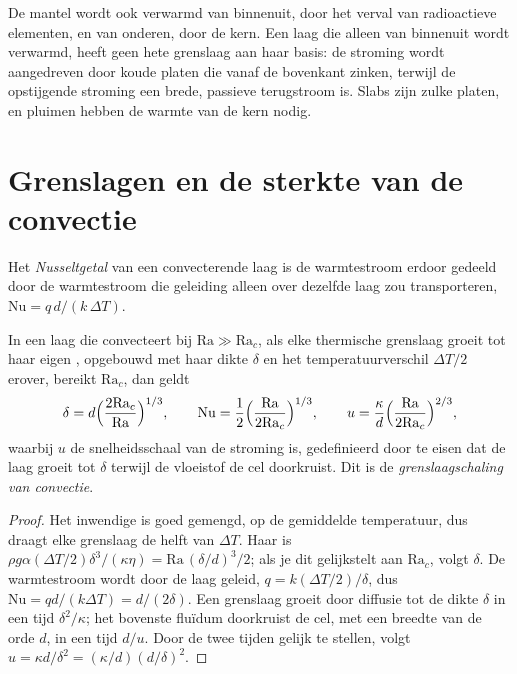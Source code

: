 De mantel wordt ook verwarmd van binnenuit, door het verval van radioactieve elementen,
en van onderen, door de kern. Een laag die alleen van binnenuit wordt verwarmd, heeft geen hete
grenslaag aan haar basis: de stroming wordt aangedreven door koude platen die vanaf de
bovenkant zinken, terwijl de opstijgende stroming een brede, passieve terugstroom is. Slabs zijn zulke platen, en
pluimen hebben de warmte van de kern nodig.

\section{Grenslagen en de sterkte van de convectie}

\begin{definition}[Nusseltgetal]\label{def:b3:mantle-convection:nusselt}
Het \emph{Nusseltgetal} van een convecterende laag is de
warmtestroom erdoor gedeeld door de warmtestroom die geleiding alleen over
dezelfde laag zou transporteren, $\mathrm{Nu} = q\,d/(k\,\Delta T)$.
\end{definition}

\begin{theorem}\label{thm:b3:mantle-convection:scaling}
In een laag die convecteert bij $\mathrm{Ra} \gg \mathrm{Ra}_c$, als elke thermische
grenslaag groeit tot haar eigen , opgebouwd met haar dikte
$\delta$ en het temperatuurverschil $\Delta T/2$ erover, bereikt
$\mathrm{Ra}_c$, dan geldt
\[
  \delta = d\Bigl(\frac{2\mathrm{Ra}_c}{\mathrm{Ra}}\Bigr)^{1/3},\qquad
  \mathrm{Nu} = \frac12\Bigl(\frac{\mathrm{Ra}}{2\mathrm{Ra}_c}\Bigr)^{1/3},
  \qquad
  u = \frac\kappa d\Bigl(\frac{\mathrm{Ra}}{2\mathrm{Ra}_c}\Bigr)^{2/3},
\]
waarbij $u$ de snelheidsschaal van de stroming is, gedefinieerd door te eisen dat de
laag groeit tot $\delta$ terwijl de vloeistof de cel doorkruist. Dit is de
\emph{grenslaagschaling van convectie}.
\end{theorem}

\begin{proof}
Het inwendige is goed gemengd, op de gemiddelde temperatuur, dus draagt elke grenslaag
de helft van $\Delta T$. Haar  is $\rho g\alpha(\Delta T/2)
\delta^3/(\kappa\eta) = \mathrm{Ra}\,(\delta/d)^3/2$; als je dit gelijkstelt aan
$\mathrm{Ra}_c$, volgt $\delta$. De warmtestroom wordt door de laag geleid,
$q = k(\Delta T/2)/\delta$, dus $\mathrm{Nu} = qd/(k\Delta T) = d/(2\delta)$.
Een grenslaag groeit door diffusie tot de dikte $\delta$ in een tijd
$\delta^2/\kappa$; het bovenste fluïdum doorkruist de cel, met een breedte van de orde
$d$, in een tijd $d/u$. Door de twee tijden gelijk te stellen, volgt $u = \kappa d/\delta^2 =
(\kappa/d)(d/\delta)^2$.
\end{proof}

